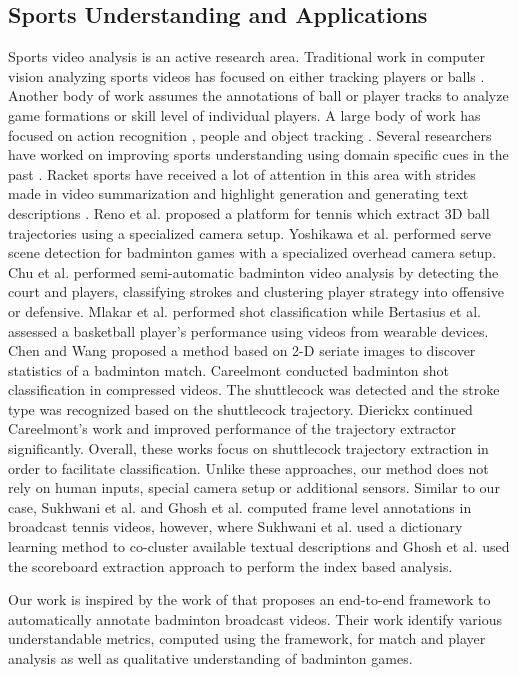 \documentclass[runningheads,a4paper]{llncs}
\begin{document}
\subsection{Sports Understanding and Applications}
Sports video analysis is an active research area. Traditional work in computer vision analyzing sports videos \cite{beetz2009aspogamo} has focused on either tracking players \cite{shitrit2011tracking} or balls \cite{maksai2016players}. Another body of work assumes the annotations of ball or player tracks to analyze game formations or skill level of individual players. A large body of work has focused on action recognition \cite{simonyan2014two, soomro2012ucf101, laptev2008learning}, people and object tracking \cite{urtasun20063d, weng2006video}. Several researchers have worked on improving sports understanding using domain specific cues in the past \cite{chen2014play, sha2014understanding}. Racket sports have received a lot of attention in this area with strides made in video summarization and highlight generation \cite{ghanem2012context} and generating text descriptions \cite{sukhwani2015tennisvid2text}. Reno et al. \cite{reno2017technology} proposed a platform for tennis which extract 3D ball trajectories using a specialized camera setup. Yoshikawa et al. \cite{yoshikawa2010automated} performed serve scene detection for badminton games with a specialized overhead camera setup. Chu et al. \cite{chu2017badminton} performed semi-automatic badminton video analysis by detecting the court and players, classifying strokes and clustering player strategy into offensive or defensive. Mlakar et al. \cite{mlakar2017analyzing} performed shot classification while Bertasius et al. \cite{bertasius2017baller} assessed a basketball player’s performance using videos from wearable devices. Chen and Wang \cite{chen2007statistical} proposed a method based on 2-D seriate images to discover statistics of a badminton match. Careelmont \cite{careelmont2013badminton} conducted badminton shot classification in compressed videos. The shuttlecock was detected and the stroke type was recognized based on the shuttlecock trajectory. Dierickx \cite{dierickx2014badminton} continued Careelmont’s work and improved performance of the trajectory extractor significantly. Overall, these works focus on shuttlecock trajectory extraction in order to facilitate classification. Unlike these approaches, our method does not rely on human inputs, special camera setup or additional sensors. Similar to our case, Sukhwani et al. \cite{sukhwani2016frame} and Ghosh et al. \cite{ghosh2017smart} computed frame level annotations in broadcast tennis videos, however, where Sukhwani et al. used a dictionary learning method to co-cluster available textual descriptions and Ghosh et al. used the scoreboard extraction approach to perform the index based analysis.\par
Our work is inspired by the work of \cite{ghosh2018towards} that proposes an end-to-end framework to automatically annotate badminton broadcast videos. Their work identify various understandable metrics, computed using the framework, for match and player analysis as well as qualitative understanding of badminton games.
\end{document}
